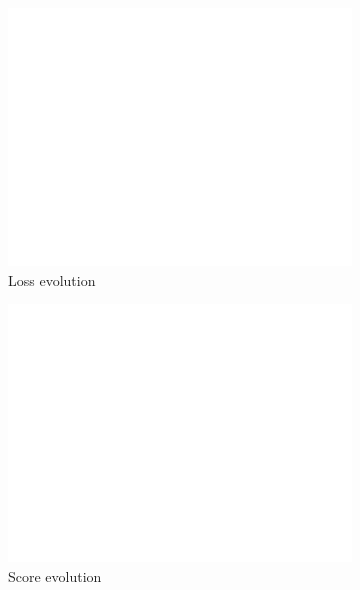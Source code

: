 \documentclass[10pt, a4paper]{article}
\begin{document}
\begin{figure}[htpb]
  \centering
  \begin{subfigure}[b]{0.32\textwidth}
      \centering
      \includegraphics[width=\textwidth]{images/Patch64_scratch_loss.pdf}
      \caption{Loss evolution}
      \label{fig:q2b_loss}
  \end{subfigure}
  \hfill
  \begin{subfigure}[b]{0.32\textwidth}
    \centering
    \includegraphics[width=\textwidth]{images/Patch64_scratch_score.pdf}
    \caption{Score evolution}
    \label{fig:q2b_score}
  \end{subfigure}
  \hfill
  \begin{subfigure}[b]{0.32\textwidth}

\end{subfigure}
\end{figure}
\end{document}
